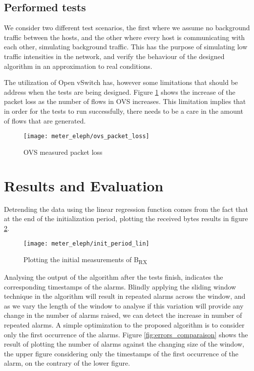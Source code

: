 \subsection{Performed tests}

\par We consider two different test scenarios, the first where we assume no background traffic between the hosts, and the other where every host is communicating
with each other, simulating background traffic. This has the purpose of simulating low traffic intensities in the network, and verify the behaviour of the designed
algorithm in an approximation to real conditions.

\par The utilization of Open vSwitch has, however some limitations that should be address when the tests are being designed. Figure \ref{fig:ovs_packet_loss} shows
the increase of the packet loss as the number of flows in OVS increases. This limitation implies that in order for the tests to run successfully, there needs to be
a care in the amount of flows that are generated.

\begin{figure} [H]
    \centering
    \texttt{[image: meter\_eleph/ovs\_packet\_loss]}
    \caption {OVS measured packet loss}
    \label{fig:ovs_packet_loss}
\end{figure} 


\section {Results and Evaluation} \label{sec:change_results}

\par Detrending the data using the linear regression function comes from the fact that at the end of the initialization period, plotting the received bytes results
in figure \ref{fig:init_plot}.

\begin{figure} 
    \centering
    \texttt{[image: meter\_eleph/init\_period\_lin]}
    \caption {Plotting the initial measurements of B\textsubscript{RX}}
    \label{fig:init_plot}
\end{figure} 
Analysing the output of the algorithm after the tests finish, indicates the corresponding timestamps of the alarms. Blindly applying the sliding window technique
in the algorithm will result in repeated alarms across the window, and as we vary the length of the window to analyse if this variation will provide any change in the
number of alarms raised, we can detect the increase in number of repeated alarms. A simple optimization to the proposed algorithm is to consider only the first
occurrence of the alarms. Figure \ref{fig:errors_comparaison} shows the result of plotting the number of alarms against the changing size of the window, the
upper figure considering only the timestamps of the first occurrence of the alarm, on the contrary of the lower figure.

